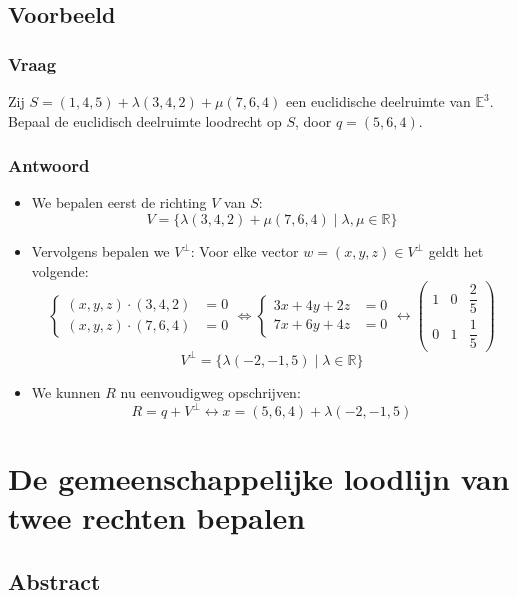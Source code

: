 \documentclass[main.tex]{subfiles}
\begin{document}
\subsection*{Voorbeeld}
\subsubsection*{Vraag}
\begin{center}
  Zij $S=(1,4,5) + \lambda(3,4,2) + \mu (7,6,4)$ een euclidische deelruimte van $\mathbb{E}^{3}$.
  Bepaal de euclidisch deelruimte loodrecht op $S$, door $q=(5,6,4)$.
\end{center}
\subsubsection*{Antwoord}
\begin{itemize}
\item We bepalen eerst de richting $V$ van $S$:
  \[ V = \{ \lambda(3,4,2) + \mu (7,6,4) \mid \lambda,\mu \in
  \mathbb{R} \} \]
\item Vervolgens bepalen we $V^{\bot}$:
  Voor elke vector $w=(x,y,z)\in V^{\bot}$ geldt het volgende:
  \[
  \left\{
    \begin{array}{cc}
      (x,y,z) \cdot (3,4,2)&= 0\\
      (x,y,z) \cdot (7,6,4)&= 0
    \end{array}
  \right.
  \Leftrightarrow
  \left\{
    \begin{array}{cc}
      3x+4y+2z&= 0\\
      7x+6y+4z&= 0
    \end{array}
  \right.
  \longleftrightarrow
  \begin{pmatrix}
    1 & 0 & \dfrac{2}{5}\\
    0 & 1 & \dfrac{1}{5}
  \end{pmatrix}
  \]
  \[
  V^{\bot} = \{ \lambda(-2, - 1, 5) \mid \lambda \in \mathbb{R} \}
  \]
\item We kunnen $R$ nu eenvoudigweg opschrijven:
  \[ R = q+V^{\bot} \leftrightarrow x = (5,6,4) + \lambda (-2, - 1, 5) \]
\end{itemize}

\newpage
\section{De gemeenschappelijke loodlijn van twee rechten bepalen}
\label{sec:gemeenschappelijke-loodlijn-bepalen}
\subsection*{Abstract}
\end{document}
